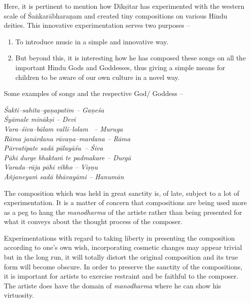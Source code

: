 Here, it is pertinent to mention how Dīkṣitar has experimented with the western scale of Śaṅkarābharaṇam and created tiny compositions on various Hindu deities. This innovative experimentation serves two purposes –

\vspace{-.3cm}

\begin{enumerate}
\item To introduce music in a simple and innovative way.

 \item But beyond this, it is interesting how he has composed these songs on all the important Hindu Gods and Goddesses, thus giving a simple means for children to be aware of our own culture in a novel way.

\end{enumerate}

\vspace{-.3cm}

Some examples of songs and the respective God/ Goddess –

\begin{myquote}
\textit{Śakti–sahita–gaṇapatim – Gaṇeśa} \\\textit{Śyāmale mīnākṣi – Devī}\\\textit{Vara–śiva–bālam vallī–lolam  – Muruga}\\\textit{Rāma janārdana rāvaṇa–mardana – Rāma} \\\textit{Pārvatīpate sadā pālayāśu – Śiva}\\\textit{Pāhi durge bhaktaṁ te padmakare – Durgā} \\\textit{Varada–rāja pāhi vibho – Viṣṇu}\\\textit{Āñjaneyaṁ sadā bhāvayāmi – Hanumān}
\end{myquote}

The composition which was held in great sanctity is, of late, subject to a lot of experimentation. It is a matter of concern that compositions are being used more as a peg to hang the \textit{manodharma} of the artiste rather than being presented for what it conveys about the thought process of the composer.

Experimentations with regard to taking liberty in presenting the composition according to one’s own wish, incorporating cosmetic changes may appear trivial but in the long run, it will totally distort the original composition and its true form will become obscure. In order to preserve the sanctity of the compositions, it is important for artists to exercise restraint and be faithful to the composer. The artiste does have the domain of \textit{manodharma} where he can show his virtuosity.


